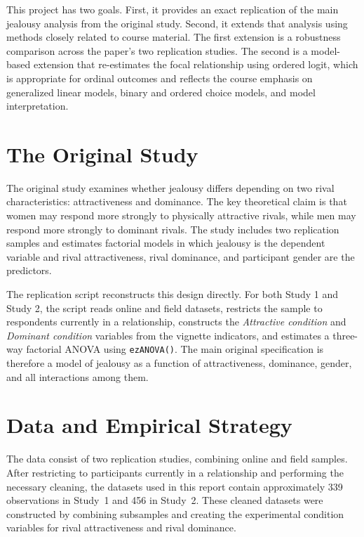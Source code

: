 \documentclass[12pt]{article}
\begin{document}
	This project has two goals. First, it provides an exact replication of the main jealousy analysis from the original study. Second, it extends that analysis using methods closely related to course material. The first extension is a robustness comparison across the paper’s two replication studies. The second is a model-based extension that re-estimates the focal relationship using ordered logit, which is appropriate for ordinal outcomes and reflects the course emphasis on generalized linear models, binary and ordered choice models, and model interpretation.
	
	\section{The Original Study}
	The original study examines whether jealousy differs depending on two rival characteristics: attractiveness and dominance. The key theoretical claim is that women may respond more strongly to physically attractive rivals, while men may respond more strongly to dominant rivals. The study includes two replication samples and estimates factorial models in which jealousy is the dependent variable and rival attractiveness, rival dominance, and participant gender are the predictors.
	
	The replication script reconstructs this design directly. For both Study 1 and Study 2, the script reads online and field datasets, restricts the sample to respondents currently in a relationship, constructs the \textit{Attractive condition} and \textit{Dominant condition} variables from the vignette indicators, and estimates a three-way factorial ANOVA using \texttt{ezANOVA()}. The main original specification is therefore a model of jealousy as a function of attractiveness, dominance, gender, and all interactions among them.
	
	\vspace{3cm}
	
	\section{Data and Empirical Strategy}

The data consist of two replication studies, combining online and field samples. After restricting to participants currently in a relationship and performing the necessary cleaning, the datasets used in this report contain approximately 339 observations in Study~1 and 456 in Study~2. These cleaned datasets were constructed by combining subsamples and creating the experimental condition variables for rival attractiveness and rival dominance.
\end{document}
